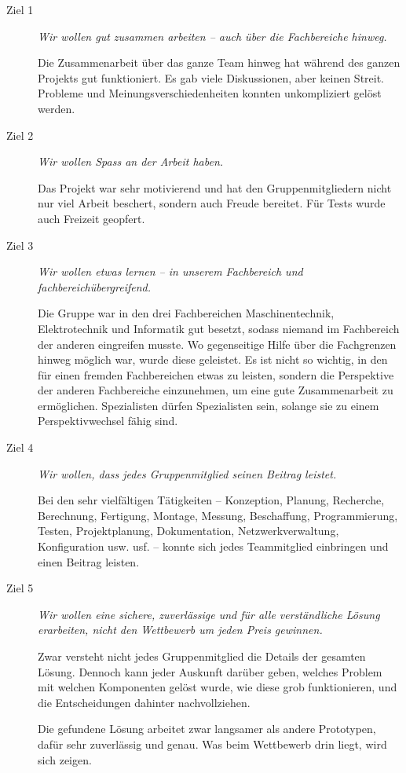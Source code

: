 \begin{description}
\item[Ziel 1] \textit{Wir wollen gut zusammen arbeiten -- auch über die Fachbereiche hinweg.}

Die Zusammenarbeit über das ganze Team hinweg hat während des ganzen Projekts gut funktioniert. Es gab viele Diskussionen, aber keinen Streit. Probleme und Meinungsverschiedenheiten konnten unkompliziert gelöst werden.

\item[Ziel 2] \textit{Wir wollen Spass an der Arbeit haben.}

Das Projekt war sehr motivierend und hat den Gruppenmitgliedern nicht nur viel Arbeit beschert, sondern auch Freude bereitet. Für Tests wurde auch Freizeit geopfert.

\item[Ziel 3] \textit{Wir wollen etwas lernen -- in unserem Fachbereich und fachbereichübergreifend.}

Die Gruppe war in den drei Fachbereichen Maschinentechnik, Elektrotechnik und Informatik gut besetzt, sodass niemand im Fachbereich der anderen eingreifen musste. Wo gegenseitige Hilfe über die Fachgrenzen hinweg möglich war, wurde diese geleistet. Es ist nicht so wichtig, in den für einen fremden Fachbereichen etwas zu leisten, sondern die Perspektive der anderen Fachbereiche einzunehmen, um eine gute Zusammenarbeit zu ermöglichen. Spezialisten dürfen Spezialisten sein, solange sie zu einem Perspektivwechsel fähig sind.

\item[Ziel 4] \textit{Wir wollen, dass jedes Gruppenmitglied seinen Beitrag leistet.}

Bei den sehr vielfältigen Tätigkeiten -- Konzeption, Planung, Recherche, Berechnung, Fertigung, Montage, Messung, Beschaffung, Programmierung, Testen, Projektplanung, Dokumentation, Netzwerkverwaltung, Konfiguration usw. usf. -- konnte sich jedes Teammitglied einbringen und einen Beitrag leisten.

\item[Ziel 5] \textit{Wir wollen eine sichere, zuverlässige und für alle verständliche Lösung erarbeiten, nicht den Wettbewerb um jeden Preis gewinnen.}

Zwar versteht nicht jedes Gruppenmitglied die Details der gesamten Lösung. Dennoch kann jeder Auskunft darüber geben, welches Problem mit welchen Komponenten gelöst wurde, wie diese grob funktionieren, und die Entscheidungen dahinter nachvollziehen.

Die gefundene Lösung arbeitet zwar langsamer als andere Prototypen, dafür sehr zuverlässig und genau. Was beim Wettbewerb drin liegt, wird sich zeigen.
\end{description}
